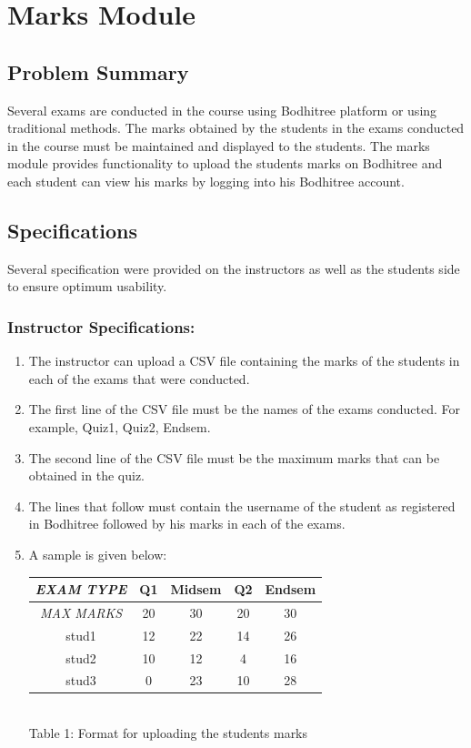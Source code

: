 \section{Marks Module}

\subsection{Problem Summary}

\hspace{0.35cm} Several exams are conducted in the course using Bodhitree platform or using traditional methods. The marks obtained by the students in the exams conducted in the course must be maintained and displayed to the students. The marks module provides functionality to upload the students marks on Bodhitree and each student can view his marks by logging into his Bodhitree account.

\subsection{Specifications}

\hspace{0.35cm} Several specification were provided on the instructors as well as the students side to ensure optimum usability.

\subsubsection*{Instructor Specifications:}

\begin{enumerate}
	\item The instructor can upload a CSV file containing the marks of the students in each of the exams that were conducted.
	\item The first line of the CSV file must be the names of the exams conducted. For example, Quiz1, Quiz2, Endsem.
	\item The second line of the CSV file must be the maximum marks that can be obtained in the quiz.
	\item The lines that follow must contain the username of the student as registered in Bodhitree followed by his marks in each of the exams.
	\item A sample is given below:
	
	\begin{center}
	\def\arraystretch{1.5}
	\begin{tabular}{|c|c|c|c|c|}
	\hline \textit{EXAM TYPE} & Q1 & Midsem & Q2 & Endsem \\ 
	\hline \textit{MAX MARKS} & 20 & 30 & 20 & 30 \\ 
	\hline stud1 & 12 & 22 & 14 & 26 \\
	\hline stud2 & 10 & 12 & 4 & 16 \\
	\hline stud3 & 0 & 23 & 10 & 28 \\
	\hline 
	\end{tabular} 
	\\ 	\vspace{0.2in} Table 1: Format for uploading the students marks
	\end{center}
	
\end{enumerate}

